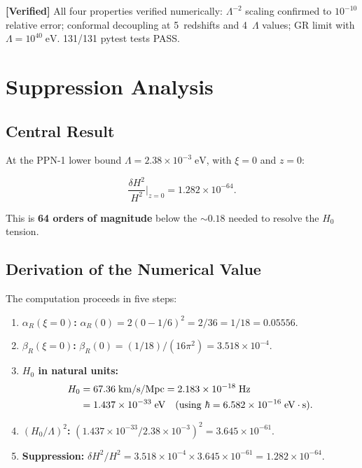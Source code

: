 \documentclass[11pt,a4paper]{article}
\newcommand{\Lam}{\Lambda}
\theoremstyle{plain}
\theoremstyle{definition}
\newcommand{\verified}[1]{%
  \par\smallskip\noindent
  \colorbox{green!10}{\parbox{\dimexpr\linewidth-2\fboxsep}{%
    \textcolor{green!50!black}{\textbf{[Verified]}} #1}}%
  \par\smallskip}
\begin{document}
\verified{All four properties verified numerically: $\Lam^{-2}$ scaling
confirmed to $10^{-10}$ relative error; conformal decoupling at 5~redshifts
and 4~$\Lam$ values; GR limit with $\Lam = 10^{40}\;\mathrm{eV}$.
131/131 pytest tests PASS.}

\section{Suppression Analysis}\label{sec:suppression}

\subsection{Central Result}

At the PPN-1 lower bound $\Lam = 2.38 \times 10^{-3}\;\mathrm{eV}$,
with $\xi = 0$ and $z = 0$:

\begin{equation}\label{eq:central-result}
  \boxed{
  \frac{\delta H^2}{H^2}\bigg|_{z=0}
  = 1.282 \times 10^{-64}.
  }
\end{equation}

This is \textbf{64 orders of magnitude} below the ${\sim}0.18$ needed
to resolve the $H_0$ tension.

\subsection{Derivation of the Numerical Value}

The computation proceeds in five steps:

\begin{enumerate}[nosep]
  \item \textbf{$\alpha_R(\xi = 0)$:}
    $\alpha_R(0) = 2(0 - 1/6)^2 = 2/36 = 1/18 = 0.05556.$

  \item \textbf{$\beta_R(\xi = 0)$:}
    $\beta_R(0) = (1/18)/(16\pi^2) = 3.518 \times 10^{-4}.$

  \item \textbf{$H_0$ in natural units:}
    \begin{align}
      H_0 &= 67.36\;\mathrm{km/s/Mpc}
      = 2.183 \times 10^{-18}\;\mathrm{Hz} \notag\\
      &= 1.437 \times 10^{-33}\;\mathrm{eV}
      \quad (\text{using }\hbar = 6.582 \times 10^{-16}\;\mathrm{eV\cdot s}).
    \end{align}

  \item \textbf{$(H_0/\Lam)^2$:}
    $(1.437 \times 10^{-33}/2.38 \times 10^{-3})^2
    = 3.645 \times 10^{-61}.$

  \item \textbf{Suppression:}
    $\delta H^2/H^2 = 3.518 \times 10^{-4} \times 3.645 \times 10^{-61}
    = 1.282 \times 10^{-64}.$
\end{enumerate}
\end{document}
